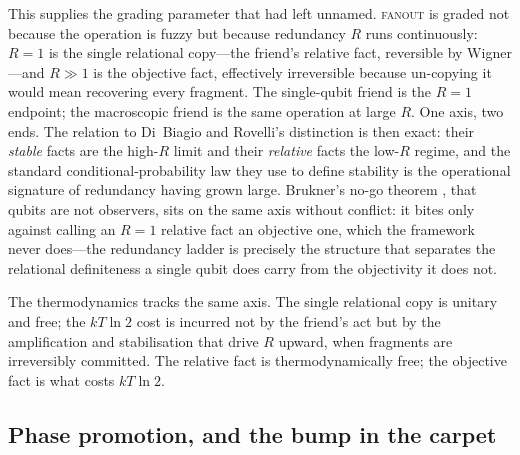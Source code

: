\documentclass{article}
\begin{document}
This supplies the grading parameter that  had left
unnamed. \textsc{fanout} is graded not because the operation is fuzzy but because
redundancy $R$ runs continuously: $R=1$ is the single relational copy---the
friend's relative fact, reversible by Wigner---and $R\gg 1$ is the objective
fact, effectively irreversible because un-copying it would mean recovering every
fragment. The single-qubit friend is the $R=1$ endpoint; the macroscopic friend
is the same operation at large $R$. One axis, two ends. The relation to
Di~Biagio and Rovelli's distinction \autocite{DiBiagioRovelli2021} is then exact:
their \emph{stable} facts are the high-$R$ limit and their \emph{relative} facts
the low-$R$ regime, and the standard conditional-probability law they use to
define stability is the operational signature of redundancy having grown large.
Brukner's no-go theorem \autocite{Brukner2021}, that qubits are not observers,
sits on the same axis without conflict: it bites only against calling an $R=1$
relative fact an objective one, which the framework never does---the redundancy
ladder is precisely the structure that separates the relational definiteness a
single qubit does carry from the objectivity it does not.

The thermodynamics tracks the same axis. The single relational copy is unitary and
free; the $kT\ln 2$ cost \autocite{Landauer_1961} is incurred not by the friend's
act but by the amplification and stabilisation that drive $R$ upward, when
fragments are irreversibly committed. The relative fact is thermodynamically free;
the objective fact is what costs $kT\ln 2$.
\subsection{Phase promotion, and the bump in the carpet}
\label{sec:wf-phase-promotion}
\end{document}
